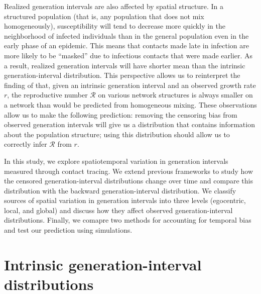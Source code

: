 \documentclass[12pt]{article}
\newcommand{\RR}{\ensuremath{{\mathcal R}}}
\begin{document}
Realized generation intervals are also affected by spatial structure.
In a structured population (that is, any population that does not mix homogeneously), susceptibility will tend to decrease more quickly in the neighborhood of infected individuals than in the general population even in the early phase of an epidemic. 
This means that contacts made late in infection are more likely to be ``masked'' due to infectious contacts that were made earlier.
As a result, realized generation intervals will have shorter mean than the intrinsic generation-interval distribution.
This perspective allows us to reinterpret the finding of \cite{trapman2016inferring} that, given an intrinsic generation interval and an observed growth rate $r$, the reproductive number $\RR$ on various network structures is always smaller on a network than would be predicted from homogeneous mixing.
These observations allow us to make the following prediction: removing the censoring bias from observed generation intervals will give us a distribution that contains information about the population structure; using this distribution should allow us to correctly infer $\RR$ from $r$.

In this study, we explore spatiotemporal variation in generation intervals measured through contact tracing.
We extend previous frameworks to study how the censored generation-interval distributions change over time and compare this distribution with the backward generation-interval distribution.
We classify sources of spatial variation in generation intervals into three levels (egocentric, local, and global) and discuss how they affect observed generation-interval distributions.
Finally, we comapre two methods for accounting for temporal bias and test our prediction using simulations.

\section{Intrinsic generation-interval distributions}
\end{document}

